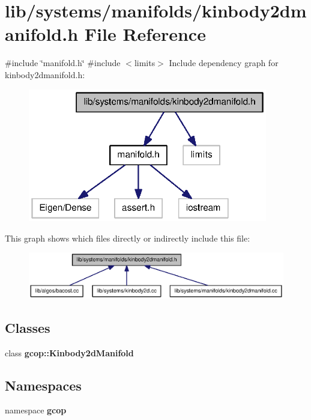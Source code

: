 \section{lib/systems/manifolds/kinbody2dmanifold.h \-File \-Reference}
\label{kinbody2dmanifold_8h}
{\ttfamily \#include \char`\"{}manifold.\-h\char`\"{}}\*
{\ttfamily \#include $<$limits$>$}\*
\-Include dependency graph for kinbody2dmanifold.\-h\-:\nopagebreak
\begin{figure}[H]
\begin{center}
\leavevmode
\includegraphics[width=296pt]{kinbody2dmanifold_8h__incl}
\end{center}
\end{figure}
\-This graph shows which files directly or indirectly include this file\-:\nopagebreak
\begin{figure}[H]
\begin{center}
\leavevmode
\includegraphics[width=350pt]{kinbody2dmanifold_8h__dep__incl}
\end{center}
\end{figure}
\subsection*{\-Classes}
\begin{DoxyCompactItemize}
\item 
class {\bf gcop\-::\-Kinbody2d\-Manifold}
\end{DoxyCompactItemize}
\subsection*{\-Namespaces}
\begin{DoxyCompactItemize}
\item 
namespace {\bf gcop}
\end{DoxyCompactItemize}
